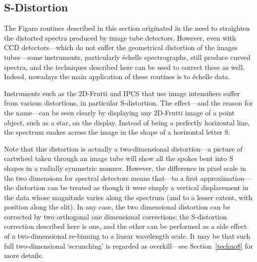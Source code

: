 \documentclass[11pt,twoside]{article}
\newcommand{\stardocinitials}  {SUN}
\newcommand{\stardocnumber}    { 86.21}
\newcommand{\stardocname}{\stardocinitials /\stardocnumber}
\newcommand{\htmlref}[2]{#1}
\newcommand{\xlabel}[1]{}
\newcommand{\latorhtm}[2]{#1}
\newcommand{\latorhtm}[2]{#2}
\begin{document}

\subsection{\xlabel{s_distortion}\label{techno7}S-Distortion}
\markboth{More complex things: S-distortion}{\stardocname}

   The Figaro routines described in this section originated in the need
   to straighten the distorted spectra produced by image tube detectors.
   However, even with CCD detectors\latorhtm{---}{-}which do not suffer the
   geometrical distortion of the images tubes\latorhtm{---}{-}some instruments,
   particularly \'echelle spectrographs, still produce curved spectra, and
   the techniques described here can be used to correct these as well.
   Indeed, nowadays the main application of these routines is to \'echelle
   data.

   Instruments such as the 2D-Frutti and IPCS that use image
   intensifiers suffer from various distortions, in particular
   S-distortion.  The effect\latorhtm{---}{-}and the reason for the
   name\latorhtm{---}{-}can be seen
   clearly by displaying any 2D-Frutti image of a point object, such as
   a star, on the display. Instead of being a perfectly horizontal line,
   the spectrum snakes across the image in the shape of a horizontal
   letter S.

   Note that this distortion is actually a two-dimensional
   distortion\latorhtm{---}{-}a picture of cartwheel taken through an image
   tube will show all the
   spokes bent into S shapes in a radially symmetric manner.  However,
   the difference in pixel scale in the two dimensions for spectral
   detectors means that\latorhtm{---}{-}to a first
   approximation\latorhtm{---}{-}the distortion can
   be treated as though it were simply a vertical displacement in the
   data whose magnitude varies along the spectrum (and to a lesser
   extent, with position along the slit). In any case, the two
   dimensional distortion can be corrected by two orthogonal one
   dimensional corrections: the S-distortion correction described here
   is one, and the other can be performed as a side effect of a
   two-dimensional re-binning to a linear wavelength scale.  It may be
   that such full two-dimensional `scrunching' is regarded as
   overkill\latorhtm{---}{-}see
   \latorhtm{Section~\ref{techno8}}
   {the section on \htmlref{wavelengths}{techno8}}
   for more details.
\end{document}
